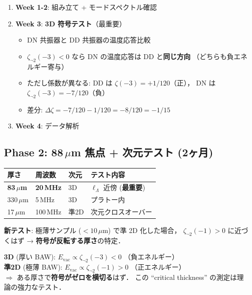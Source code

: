 \documentclass[11pt,a4paper]{article}
\begin{document}
\begin{enumerate}
\item \textbf{Week 1-2}: 組み立て + モードスペクトル確認
\item \textbf{Week 3}: \textbf{3D 符号テスト}（最重要）
  \begin{itemize}
  \item DN 共振器と DD 共振器の温度応答比較
  \item $\zeta_{\neg 2}(-3) < 0$ なら DN の温度応答は DD と\textbf{同じ方向}
    （どちらも負エネルギー寄与）
  \item ただし係数が異なる: DD は $\zeta(-3) = +1/120$（正），
    DN は $\zeta_{\neg 2}(-3) = -7/120$（負）
  \item 差分: $\Delta\zeta = -7/120 - 1/120 = -8/120 = -1/15$
  \end{itemize}
\item \textbf{Week 4}: データ解析
\end{enumerate}

\subsection{Phase 2: 88\,$\mu$m 焦点 + 次元テスト (2ヶ月)}

\begin{center}
\begin{tabular}{llll}
\toprule
厚さ & 周波数 & 次元 & テスト内容 \\
\midrule
\textbf{83\,$\mu$m} & \textbf{20\,MHz} & 3D & $\ell_\Lambda$ 近傍 (\textbf{最重要}) \\
330\,$\mu$m & 5\,MHz & 3D & プラトー内 \\
17\,$\mu$m & 100\,MHz & 準2D & 次元クロスオーバー \\
\bottomrule
\end{tabular}
\end{center}

\textbf{新テスト}: 極薄サンプル ($< 10\,\mu$m) で準 2D 化した場合，
$\zeta_{\neg 2}(-1) > 0$ に近づくはず → \textbf{符号が反転する厚さ}の特定．

\begin{tcolorbox}[colback=yellow!5,colframe=yellow!60!black,title=次元クロスオーバー予測]
\textbf{3D} (厚い BAW): $E_\mathrm{vac} \propto \zeta_{\neg 2}(-3) < 0$ （負エネルギー）\\
\textbf{準2D} (極薄 BAW): $E_\mathrm{vac} \propto \zeta_{\neg 2}(-1) > 0$ （正エネルギー）\\[4pt]
$\Rightarrow$ ある厚さで\textbf{符号がゼロを横切る}はず．
この ``critical thickness'' の測定は理論の強力なテスト．
\end{tcolorbox}
\end{document}
